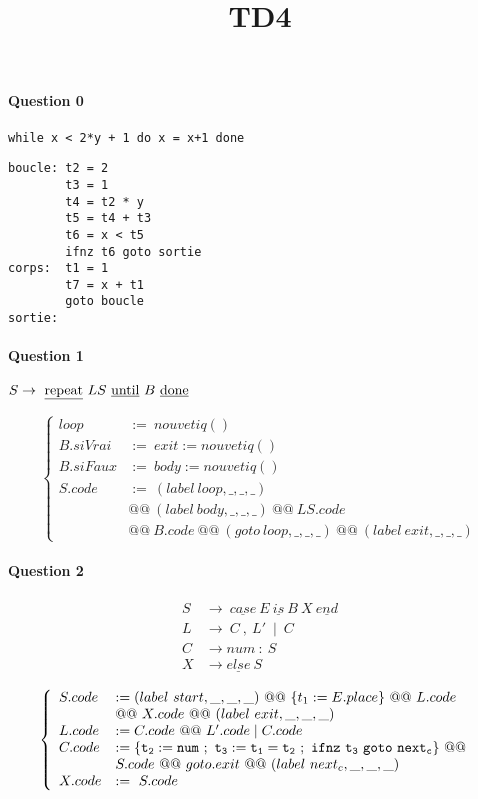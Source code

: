 \documentclass[a4paper, 11pt]{article}
\title{TD4}
\begin{document}
\maketitle

\paragraph{Question 0}

{\tt while x < 2*y + 1 do x = x+1 done}

\begin{verbatim}
boucle: t2 = 2
        t3 = 1
        t4 = t2 * y
        t5 = t4 + t3
        t6 = x < t5
        ifnz t6 goto sortie
corps:	t1 = 1
        t7 = x + t1
        goto boucle
sortie:
\end{verbatim}

\paragraph{Question 1}

\(S \to\ \text{\underline{repeat}}\ LS\ \text{\underline{until}}\ B\ \text{\underline{done}}\)

\[\left\{\begin{array}{ll}
loop     &:=\ nouvetiq() \\
B.siVrai &:=\ exit := nouvetiq() \\
B.siFaux &:=\ body := nouvetiq() \\
S.code   &:=\ (label\ loop,\_,\_,\_)\ \\
& @@\ (label\ body,\_,\_,\_)\ @@\ LS.code\ \\
& @@\ B.code\ @@\ (goto\ loop,\_,\_,\_)\ @@\ (label\ exit,\_,\_,\_)
\end{array}\right.\]

\paragraph{Question 2}

\begin{align*}
S &\to\ \underline{case}\ E\ \underline{is}\ B\ X\ \underline{end} \\
L &\to\ C\ ,\ L'\ \mid\ C \\
C &\to num\ \colon\ S \\
X &\to \underline{else}\ S
\end{align*}

\[\left\{\begin{array}{ll}
S.code   &:= (label\ start,\_,\_,\_)\ @@\ \{t_1 := E.place\}\ @@\ L.code\ \\
& @@\ X.code\ @@\ (label\ exit,\_,\_,\_) \\
L.code   &:= C.code\ @@\ L'.code \mid C.code \\
C.code   &:= \{\tt t_2 := num\ ;\ t_3 := t_1=t_2\ ;\ ifnz\ t_3\ goto\ next_c\}\ @@\ \\
& S.code\ @@\ goto.exit\ @@\ (label\ next_c,\_,\_,\_) \\
X.code   &:=\ S.code
\end{array}\right.\]
\end{document}
